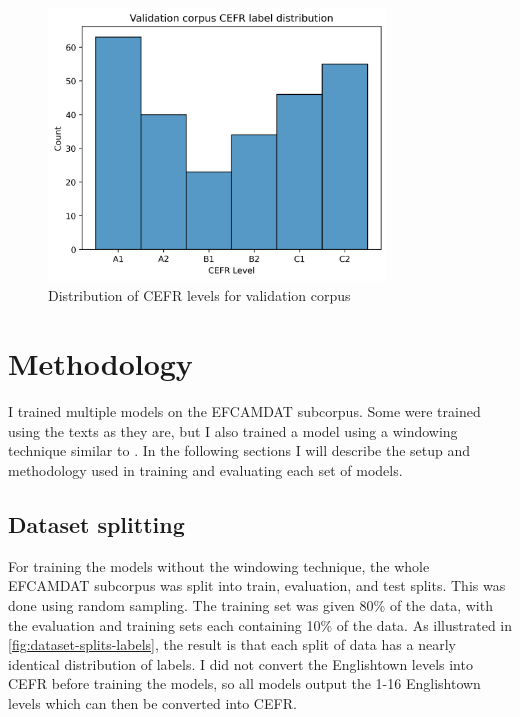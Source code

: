 \documentclass[11pt,a4paper]{article}
\begin{document}
\begin{figure}
  \centering
  \includegraphics[width=0.8\textwidth]{figures/cefr-distribution-validation.png}
  \caption{Distribution of CEFR levels for validation corpus}
  \label{fig:validation-distribution}
\end{figure}

\section{Methodology}

I trained multiple models on the EFCAMDAT subcorpus. Some were trained using the
texts as they are, but I also trained a model using a windowing technique
similar to \parencite{kerz-etal-2021-automated}. In the following sections I
will describe the setup and methodology used in training and evaluating each
set of models.

\subsection{Dataset splitting}

For training the models without the windowing technique, the whole EFCAMDAT subcorpus was split
into train, evaluation, and test splits. This was done using random sampling.
The training set was given 80\% of the data, with the evaluation and training
sets each containing 10\% of the data. As illustrated in
\autoref{fig:dataset-splits-labels}, the result is that each split of data has
a nearly identical distribution of labels. I did not convert the Englishtown
levels into CEFR before training the models, so all models output the 1-16
Englishtown levels which can then be converted into CEFR.
\end{document}
